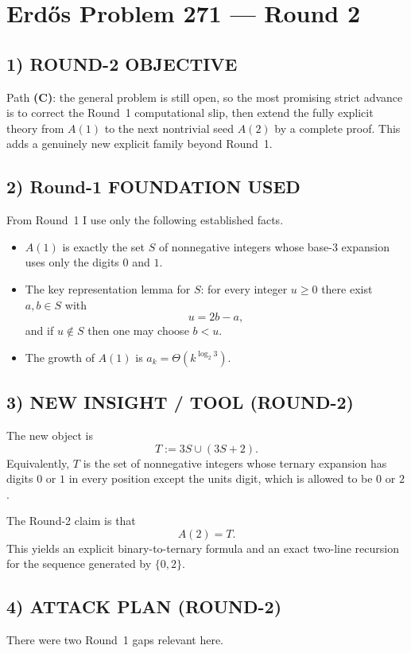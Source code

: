 \section{Erd\H{o}s Problem 271 --- Round 2}

\subsection*{1) ROUND-2 OBJECTIVE}
Path \textbf{(C)}: the general problem is still open, so the most promising strict advance is to correct the Round~1 computational slip, then extend the fully explicit theory from $A(1)$ to the next nontrivial seed $A(2)$ by a complete proof. This adds a genuinely new explicit family beyond Round~1.

\subsection*{2) Round-1 FOUNDATION USED}
From Round~1 I use only the following established facts.

\begin{itemize}
\item $A(1)$ is exactly the set $S$ of nonnegative integers whose base-$3$ expansion uses only the digits $0$ and $1$.
\item The key representation lemma for $S$: for every integer $u\ge 0$ there exist $a,b\in S$ with
\[
u=2b-a,
\]
and if $u\notin S$ then one may choose $b<u$.
\item The growth of $A(1)$ is $a_k=\Theta(k^{\log_2 3})$.
\end{itemize}

\subsection*{3) NEW INSIGHT / TOOL (ROUND-2)}
The new object is
\[
T:=3S\cup(3S+2).
\]
Equivalently, $T$ is the set of nonnegative integers whose ternary expansion has digits $0$ or $1$ in every position except the units digit, which is allowed to be $0$ or $2$.

The Round-2 claim is that
\[
A(2)=T.
\]
This yields an explicit binary-to-ternary formula and an exact two-line recursion for the sequence generated by $\{0,2\}$.

\subsection*{4) ATTACK PLAN (ROUND-2)}
There were two Round~1 gaps relevant here.

